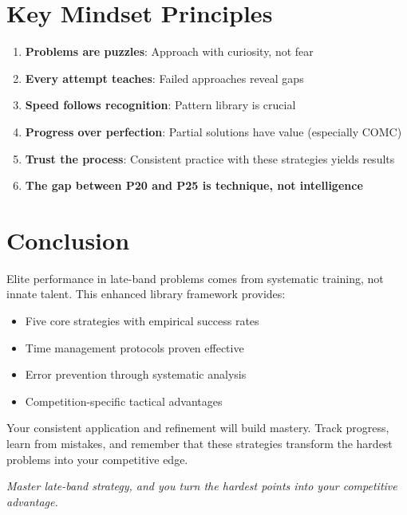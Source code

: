 \documentclass[]{article}
\begin{document}
\section{Key Mindset Principles}

\begin{strategybox}
\begin{enumerate}
    \item \textbf{Problems are puzzles}: Approach with curiosity, not fear
    \item \textbf{Every attempt teaches}: Failed approaches reveal gaps
    \item \textbf{Speed follows recognition}: Pattern library is crucial
    \item \textbf{Progress over perfection}: Partial solutions have value (especially COMC)
    \item \textbf{Trust the process}: Consistent practice with these strategies yields results
    \item \textbf{The gap between P20 and P25 is technique, not intelligence}
\end{enumerate}
\end{strategybox}

\section{Conclusion}

Elite performance in late-band problems comes from systematic training, not innate talent. This enhanced library framework provides:
\begin{itemize}[leftmargin=*]
    \item Five core strategies with empirical success rates
    \item Time management protocols proven effective
    \item Error prevention through systematic analysis
    \item Competition-specific tactical advantages
\end{itemize}

Your consistent application and refinement will build mastery. Track progress, learn from mistakes, and remember that these strategies transform the hardest problems into your competitive edge.

\vfill
\begin{center}
\textit{Master late-band strategy, and you turn the hardest points into your competitive advantage.}
\end{center}
\end{document}
